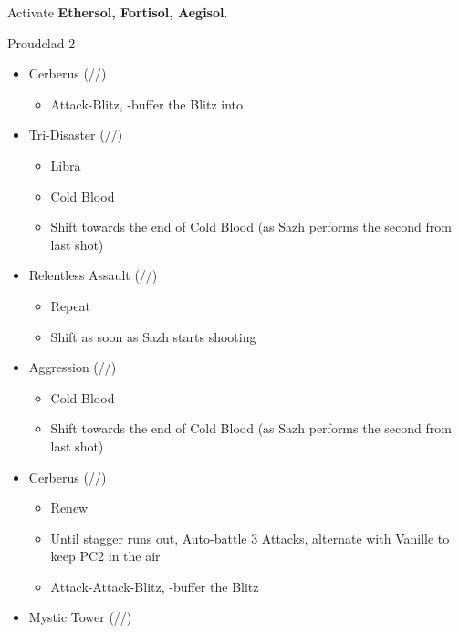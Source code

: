 Activate \textbf{Ethersol, Fortisol, Aegisol}.
\vfill
\renewcommand{\first}{[1] Aggression (\rav/\com/\com)}
\renewcommand{\second}{[2] Cerberus (\com/\com/\com)}
\renewcommand{\third}{[3] Mystic Tower (\rav/\sen/\rav)}
\renewcommand{\fourth}{[4] Tireless Charge (\com/\com/\med)}
\renewcommand{\fifth}{[5] Relentless Assault (\rav/\com/\rav)}
\renewcommand{\sixth}{[6] Tri-Disaster (\rav/\rav/\rav)}
\begin{battle}[2:03]{Proudclad 2}
		\begin{itemize}
			\item \second
			      \begin{itemize}
				      \item Attack-Blitz, \rav-buffer the Blitz into
			      \end{itemize}
			\item \sixth
			      \begin{itemize}
				      \item Libra
				      \item Cold Blood
				      \item Shift towards the end of Cold Blood (as Sazh performs the second from last shot)
			      \end{itemize}
			\item \fifth
			      \begin{itemize}
				      \item Repeat
				      \item Shift as soon as Sazh starts shooting
			      \end{itemize}
			\item \first
			      \begin{itemize}
				      \item Cold Blood
				      \item Shift towards the end of Cold Blood (as Sazh performs the second from last shot)
			      \end{itemize}
			\item \second
			      \begin{itemize}
				      \item Renew
				      \item Until stagger runs out, Auto-battle 3 Attacks, alternate with Vanille to keep PC2 in the air
				      \item Attack-Attack-Blitz, \rav-buffer the Blitz
			      \end{itemize}
			\item \third
			      \begin{itemize}

\end{itemize}
\end{itemize}
\end{battle}
